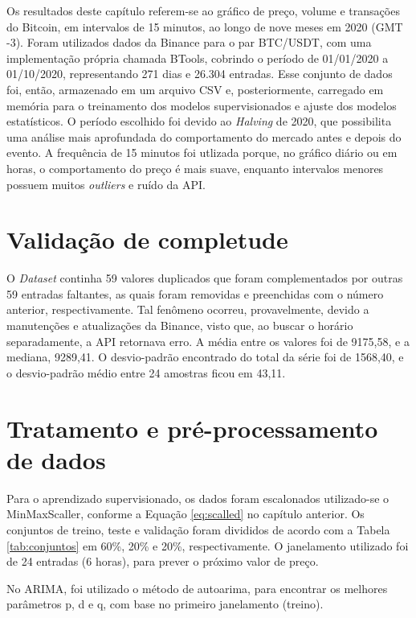 Os resultados deste capítulo referem-se ao gráfico de preço, volume e transações do Bitcoin, em intervalos de 15 minutos, ao longo de nove meses em 2020 (GMT -3).
Foram utilizados dados da Binance para o par BTC/USDT, com uma implementação própria chamada BTools, cobrindo o período de 01/01/2020 a 01/10/2020, representando 271 dias e 26.304 entradas.
Esse conjunto de dados foi, então, armazenado em um arquivo CSV e, posteriormente, carregado em memória para o treinamento dos modelos supervisionados e ajuste dos modelos estatísticos.
O período escolhido foi devido ao \textit{Halving} de 2020, que possibilita uma análise mais aprofundada do comportamento do mercado antes e depois do evento.
A frequência de 15 minutos foi utlizada porque, no gráfico diário ou em horas, o comportamento do preço é mais suave, enquanto intervalos menores possuem muitos \textit{outliers} e ruído da API.

\section{Validação de completude}
O \textit{Dataset} continha 59 valores duplicados que foram complementados por outras 59 entradas faltantes, as quais foram removidas e preenchidas com o número anterior, respectivamente.
Tal fenômeno ocorreu, provavelmente, devido a manutenções e atualizações da Binance, visto que, ao buscar o horário separadamente, a API retornava erro.
A média entre os valores foi de 9175,58, e a mediana, 9289,41. O desvio-padrão encontrado do total da série foi de 1568,40, e o desvio-padrão médio entre 24 amostras ficou em 43,11.

\section{Tratamento e pré-processamento de dados}
Para o aprendizado supervisionado, os dados foram escalonados utilizado-se o MinMaxScaller, conforme a Equação \ref{eq:scalled} no capítulo anterior. Os conjuntos de treino, teste e validação foram divididos de acordo com a Tabela \ref{tab:conjuntos} em 60\%, 20\% e 20\%, respectivamente. 
O janelamento utilizado foi de 24 entradas (6 horas), para prever o próximo valor de preço.

No ARIMA, foi utilizado o método de autoarima, para encontrar os melhores parâmetros p, d e q, com base no primeiro janelamento (treino).

